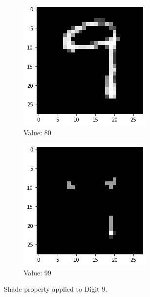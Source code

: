 \begin{figure}[htb!]
\begin{subfigure}[b]{.3\textwidth}
            \includegraphics[width=\textwidth]{images/shade2.png}
            \caption{Value: 80}
            \label{fig:Rotate-misclass0}
        \end{subfigure}%
        \begin{subfigure}[b]{.3\textwidth}
            \centering
            \includegraphics[width=\linewidth]{images/shade3.png}
            \caption{Value: 99}
            \label{fig:Rotate-misclass0}
        \end{subfigure}
        
        \caption{Shade property applied to Digit 9.}
        \label{fig:Shade-property}
    \end{figure}
    \FloatBarrier
    
